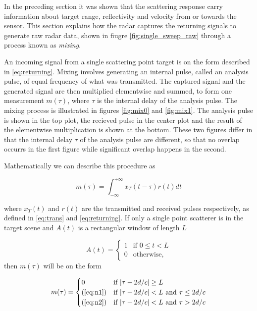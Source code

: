 In the preceding section it was shown that the scattering response carry information about target range, reflectivity and velocity from or towards the sensor. This section explains how the radar captures the returning signals to generate raw radar data, shown in fiugre \ref{fig:single_sweep_raw} through a process known as \emph{mixing}.

An incoming signal from a single scattering point target is on the form described in \ref{eq:returning}. Mixing involves generating an internal pulse, called an analysis pulse, of equal frequency of what was transmitted. The captured signal and the generated signal are then multiplied elementwise and summed, to form one measurement $m(\tau)$, where $\tau$ is the internal delay of the analysis pulse. The mixing process is illustrated in figures \ref{fig:mix0} and \ref{fig:mix1}. The analysis pulse is shown in the top plot, the recieved pulse in the center plot and the result of the elementwise multiplication is shown at the bottom. These two figures differ in that the internal delay $\tau$ of the analysis pulse are different, so that no overlap occurrs in the first figure while significant overlap happens in the second. 

Mathematically we can describe this procedure as

\begin{equation}
	m(\tau) = \int_{-\infty}^{+\infty} x_T(t - \tau)r(t) dt
\end{equation}

where $x_T(t)$ and $r(t)$ are the transmitted and received pulses respectively, as defined in \ref{eq:trans} and \ref{eq:returning}. If only a single point scatterer is in the target scene and $A(t)$ is a rectangular window of length $L$

\begin{equation}
	A(t) = \begin{cases}
		1 & \text{if $0\leq t < L$} \\
		0 & \text{otherwise},
	\end{cases}
\end{equation}
then $m(\tau)$ will be on the form 

\begin{equation}
	m(\tau) = 
	\begin{cases}
		0 & \text{if $|\tau-2d/c|\geq L$} \\
		\text{(\ref{eq:n1})} & \text{if $|\tau-2d/c|<L$ and $\tau \leq 2d/c$} \\
		\text{(\ref{eq:n2})} & \text{if $|\tau-2d/c|<L$ and $\tau > 2d/c$}
	\end{cases}
\end{equation}

